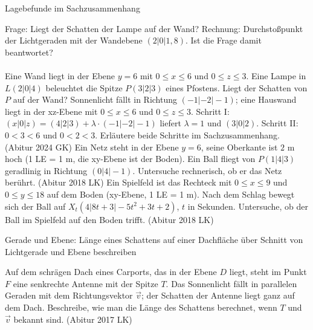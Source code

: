\setcounter{aufgabe}{15}

\begin{aufgabe}{Lagebefunde im Sachzusammenhang}
\begin{teile}
\teil Frage: Liegt der Schatten der Lampe auf der Wand? Rechnung: Durchstoßpunkt der Lichtgeraden mit der Wandebene $(2 | 0 | 1{,}8)$. Ist die Frage damit beantwortet? \\  \\ 
\teil Eine Wand liegt in der Ebene $y = 6$ mit $0 \le x \le 6$ und $0 \le z \le 3$. Eine Lampe in $L(2 | 0 | 4)$ beleuchtet die Spitze $P(3 | 2 | 3)$ eines Pfostens. Liegt der Schatten von $P$ auf der Wand?
\teil Sonnenlicht fällt in Richtung $(-1 | -2 | -1)$; eine Hauswand liegt in der xz-Ebene mit $0 \le x \le 6$ und $0 \le z \le 3$. Schritt I: $(x | 0 | z) = (4 | 2 | 3) + \lambda \cdot (-1 | -2 | -1)$ liefert $\lambda = 1$ und $(3 | 0 | 2)$. Schritt II: $0 < 3 < 6$ und $0 < 2 < 3$. Erläutere beide Schritte im Sachzusammenhang. \hfill (Abitur 2024 GK)
\teil Ein Netz steht in der Ebene $y = 6$, seine Oberkante ist $2$ m hoch (1 LE = 1 m, die xy-Ebene ist der Boden). Ein Ball fliegt von $P(1 | 4 | 3)$ geradlinig in Richtung $(0 | 4 | -1)$. Untersuche rechnerisch, ob er das Netz berührt. \hfill (Abitur 2018 LK)
\teil Ein Spielfeld ist das Rechteck mit $0 \le x \le 9$ und $0 \le y \le 18$ auf dem Boden (xy-Ebene, 1 LE = 1 m). Nach dem Schlag bewegt sich der Ball auf $X_t(4 | 8t + 3 | -5t^2 + 3t + 2)$, $t$ in Sekunden. Untersuche, ob der Ball im Spielfeld auf den Boden trifft. \hfill (Abitur 2018 LK)
\end{teile}
\end{aufgabe}

\begin{aufgabe}{Gerade und Ebene: Länge eines Schattens auf einer Dachfläche über Schnitt von Lichtgerade und Ebene beschreiben}
\begin{teile}
\teil Auf dem schrägen Dach eines Carports, das in der Ebene $D$ liegt, steht im Punkt $F$ eine senkrechte Antenne mit der Spitze $T$. Das Sonnenlicht fällt in parallelen Geraden mit dem Richtungsvektor $\vec{v}$; der Schatten der Antenne liegt ganz auf dem Dach. Beschreibe, wie man die Länge des Schattens berechnet, wenn $T$ und $\vec{v}$ bekannt sind. \hfill (Abitur 2017 LK)
\end{teile}
\end{aufgabe}

